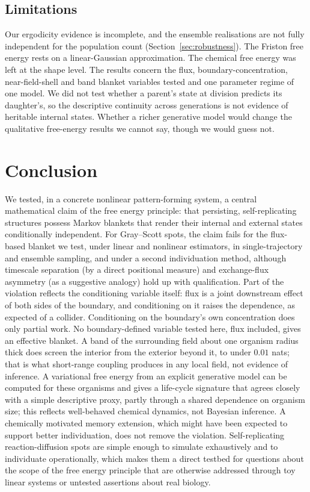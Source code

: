 \documentclass[11pt]{article}
\begin{document}
\subsection{Limitations}
\label{sec:limitations}

Our ergodicity evidence is incomplete, and the ensemble realisations are not fully independent for the population count (Section~\ref{sec:robustness}). The Friston free energy rests on a linear-Gaussian approximation. The chemical free energy was left at the shape level. The results concern the flux, boundary-concentration, near-field-shell and band blanket variables tested and one parameter regime of one model. We did not test whether a parent's state at division predicts its daughter's, so the descriptive continuity across generations is not evidence of heritable internal states. Whether a richer generative model would change the qualitative free-energy results we cannot say, though we would guess not.

\section{Conclusion}
\label{sec:conclusion}

We tested, in a concrete nonlinear pattern-forming system, a central mathematical claim of the free energy principle: that persisting, self-replicating structures possess Markov blankets that render their internal and external states conditionally independent. For Gray--Scott spots, the claim fails for the flux-based blanket we test, under linear and nonlinear estimators, in single-trajectory and ensemble sampling, and under a second individuation method, although timescale separation (by a direct positional measure) and exchange-flux asymmetry (as a suggestive analogy) hold up with qualification. Part of the violation reflects the conditioning variable itself: flux is a joint downstream effect of both sides of the boundary, and conditioning on it raises the dependence, as expected of a collider. Conditioning on the boundary's own concentration does only partial work. No boundary-defined variable tested here, flux included, gives an effective blanket. A band of the surrounding field about one organism radius thick does screen the interior from the exterior beyond it, to under $0.01$ nats; that is what short-range coupling produces in any local field, not evidence of inference. A variational free energy from an explicit generative model can be computed for these organisms and gives a life-cycle signature that agrees closely with a simple descriptive proxy, partly through a shared dependence on organism size; this reflects well-behaved chemical dynamics, not Bayesian inference. A chemically motivated memory extension, which might have been expected to support better individuation, does not remove the violation. Self-replicating reaction-diffusion spots are simple enough to simulate exhaustively and to individuate operationally, which makes them a direct testbed for questions about the scope of the free energy principle that are otherwise addressed through toy linear systems or untested assertions about real biology.
\end{document}
